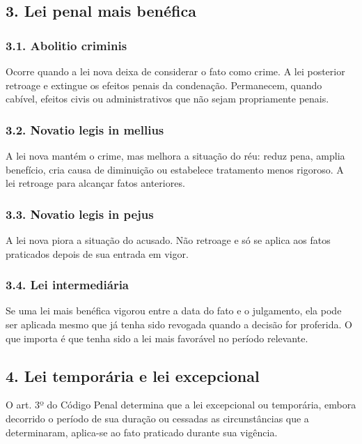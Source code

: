 \documentclass[11pt,a4paper]{article}
\begin{document}
\subsection*{3. Lei penal mais benéfica}

\subsubsection*{3.1. Abolitio criminis}

Ocorre quando a lei nova deixa de considerar o fato como crime. A lei posterior retroage e extingue os efeitos penais da condenação. Permanecem, quando cabível, efeitos civis ou administrativos que não sejam propriamente penais.

\subsubsection*{3.2. Novatio legis in mellius}

A lei nova mantém o crime, mas melhora a situação do réu: reduz pena, amplia benefício, cria causa de diminuição ou estabelece tratamento menos rigoroso. A lei retroage para alcançar fatos anteriores.

\subsubsection*{3.3. Novatio legis in pejus}

A lei nova piora a situação do acusado. Não retroage e só se aplica aos fatos praticados depois de sua entrada em vigor.

\subsubsection*{3.4. Lei intermediária}

Se uma lei mais benéfica vigorou entre a data do fato e o julgamento, ela pode ser aplicada mesmo que já tenha sido revogada quando a decisão for proferida. O que importa é que tenha sido a lei mais favorável no período relevante.

\subsection*{4. Lei temporária e lei excepcional}

O art. 3º do Código Penal determina que a lei excepcional ou temporária, embora decorrido o período de sua duração ou cessadas as circunstâncias que a determinaram, aplica-se ao fato praticado durante sua vigência.
\end{document}
